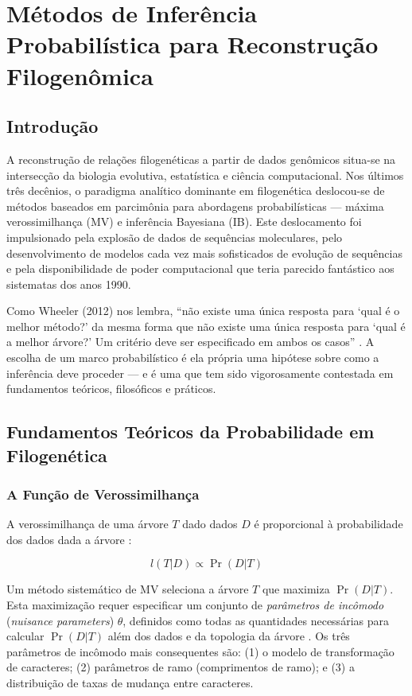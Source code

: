 
\chapter{Métodos de Inferência Probabilística para Reconstrução Filogenômica}

\section{Introdução}

A reconstrução de relações filogenéticas a partir de dados genômicos situa-se na intersecção da biologia evolutiva, estatística e ciência computacional. Nos últimos três decênios, o paradigma analítico dominante em filogenética deslocou-se de métodos baseados em parcimônia para abordagens probabilísticas --- máxima verossimilhança (MV) e inferência Bayesiana (IB). Este deslocamento foi impulsionado pela explosão de dados de sequências moleculares, pelo desenvolvimento de modelos cada vez mais sofisticados de evolução de sequências e pela disponibilidade de poder computacional que teria parecido fantástico aos sistematas dos anos 1990.

Como Wheeler (2012) nos lembra, ``não existe uma única resposta para `qual é o melhor método?' da mesma forma que não existe uma única resposta para `qual é a melhor árvore?' Um critério deve ser especificado em ambos os casos'' \parencite{wheeler2012}. A escolha de um marco probabilístico é ela própria uma hipótese sobre como a inferência deve proceder --- e é uma que tem sido vigorosamente contestada em fundamentos teóricos, filosóficos e práticos.

\section{Fundamentos Teóricos da Probabilidade em Filogenética}

\subsection{A Função de Verossimilhança}

A verossimilhança de uma árvore $T$ dado dados $D$ é proporcional à probabilidade dos dados dada a árvore \parencite{edwards1972}:

$$l(T|D) \propto \Pr(D|T)$$

Um método sistemático de MV seleciona a árvore $T$ que maximiza $\Pr(D|T)$. Esta maximização requer especificar um conjunto de \textit{parâmetros de incômodo} (\textit{nuisance parameters}) $\theta$, definidos como todas as quantidades necessárias para calcular $\Pr(D|T)$ além dos dados e da topologia da árvore \parencite{wheeler2012}. Os três parâmetros de incômodo mais consequentes são: (1) o modelo de transformação de caracteres; (2) parâmetros de ramo (comprimentos de ramo); e (3) a distribuição de taxas de mudança entre caracteres.


